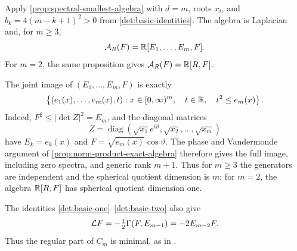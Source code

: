 Apply \cref{prop:spectral-smallest-algebra} with \(d=m\), roots
\(x_i\), and \(b_k=4(m-k+1)^2>0\) from
\cref{det:basic-identities}. The algebra is Laplacian and, for \(m\ge3\),
\begin{equation}\label{det:smallest-algebra}
 \mathcal A_R(F)=\mathbb R[E_1,\ldots,E_m,F].
\end{equation}
For \(m=2\), the same proposition gives
\(\mathcal A_R(F)=\mathbb R[R,F]\).

The joint image of \((E_1,\ldots,E_m,F)\) is exactly
\begin{equation}\label{det:quotient-image}
 \left\{(e_1(x),\ldots,e_m(x),t):
       x\in[0,\infty)^m,\quad t\in\mathbb R,\quad t^2\le e_m(x)\right\}.
\end{equation}
Indeed, \(F^2\le|\det Z|^2=E_m\), and the diagonal matrices
\[
 Z=\operatorname{diag}\left(\sqrt{x_1}e^{i\vartheta},
                   \sqrt{x_2},\ldots,\sqrt{x_m}\right)
\]
have \(E_k=e_k(x)\) and \(F=\sqrt{e_m(x)}\cos\vartheta\).
The phase and Vandermonde argument of
\cref{prop:norm-product-exact-algebra} therefore gives the full
image, including zero spectra, and generic rank \(m+1\).
Thus for \(m\ge3\) the generators are independent and the spherical
quotient dimension is \(m\); for \(m=2\), the algebra \(\mathbb R[R,F]\)
has spherical quotient dimension one.

The identities \eqref{det:basic-one}--\eqref{det:basic-two} also give
\begin{equation}\label{det:mean-curvature}
 \mathcal L F
 =-\tfrac12\Gamma(F,E_{m-1})=-2E_{m-2}F.
\end{equation}
Thus the regular part of $C_m$ is minimal, as in
\cite[Corollary~5.2 and Example~5.4]{HoppeTkachev19}.

